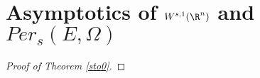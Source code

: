 \documentclass[../main.tex]{subfiles}
\begin{document}
\section{Asymptotics of $ W^{s,1}(\R^{n}) $ and $ Per_{s}(E,\Omega) $}

\begin{proof}[Proof of Theorem \ref{sto0}]
     
\end{proof}
\end{document}
